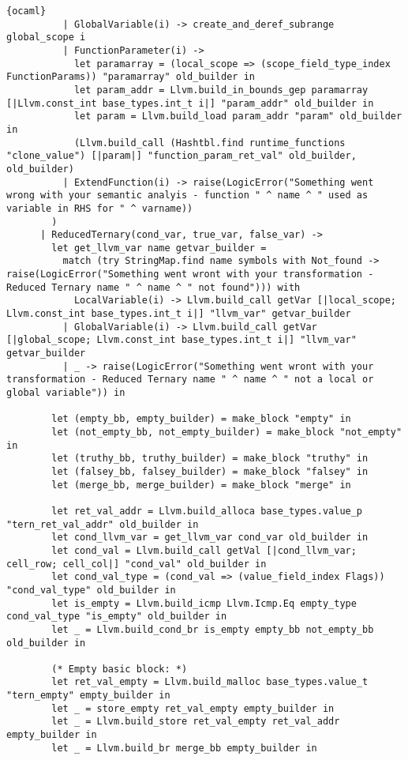 \begin{lstlisting}{ocaml}
          | GlobalVariable(i) -> create_and_deref_subrange global_scope i
          | FunctionParameter(i) ->
            let paramarray = (local_scope => (scope_field_type_index FunctionParams)) "paramarray" old_builder in
            let param_addr = Llvm.build_in_bounds_gep paramarray [|Llvm.const_int base_types.int_t i|] "param_addr" old_builder in
            let param = Llvm.build_load param_addr "param" old_builder in
            (Llvm.build_call (Hashtbl.find runtime_functions "clone_value") [|param|] "function_param_ret_val" old_builder, old_builder)
          | ExtendFunction(i) -> raise(LogicError("Something went wrong with your semantic analyis - function " ^ name ^ " used as variable in RHS for " ^ varname))
        )
      | ReducedTernary(cond_var, true_var, false_var) ->
        let get_llvm_var name getvar_builder =
          match (try StringMap.find name symbols with Not_found -> raise(LogicError("Something went wront with your transformation - Reduced Ternary name " ^ name ^ " not found"))) with
            LocalVariable(i) -> Llvm.build_call getVar [|local_scope; Llvm.const_int base_types.int_t i|] "llvm_var" getvar_builder
          | GlobalVariable(i) -> Llvm.build_call getVar [|global_scope; Llvm.const_int base_types.int_t i|] "llvm_var" getvar_builder
          | _ -> raise(LogicError("Something went wront with your transformation - Reduced Ternary name " ^ name ^ " not a local or global variable")) in

        let (empty_bb, empty_builder) = make_block "empty" in
        let (not_empty_bb, not_empty_builder) = make_block "not_empty" in
        let (truthy_bb, truthy_builder) = make_block "truthy" in
        let (falsey_bb, falsey_builder) = make_block "falsey" in
        let (merge_bb, merge_builder) = make_block "merge" in

        let ret_val_addr = Llvm.build_alloca base_types.value_p "tern_ret_val_addr" old_builder in
        let cond_llvm_var = get_llvm_var cond_var old_builder in
        let cond_val = Llvm.build_call getVal [|cond_llvm_var; cell_row; cell_col|] "cond_val" old_builder in
        let cond_val_type = (cond_val => (value_field_index Flags)) "cond_val_type" old_builder in
        let is_empty = Llvm.build_icmp Llvm.Icmp.Eq empty_type cond_val_type "is_empty" old_builder in
        let _ = Llvm.build_cond_br is_empty empty_bb not_empty_bb old_builder in

        (* Empty basic block: *)
        let ret_val_empty = Llvm.build_malloc base_types.value_t "tern_empty" empty_builder in
        let _ = store_empty ret_val_empty empty_builder in
        let _ = Llvm.build_store ret_val_empty ret_val_addr empty_builder in
        let _ = Llvm.build_br merge_bb empty_builder in


\end{lstlisting}
